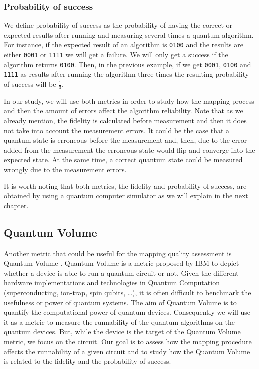 
\subsubsection{Probability of success}

We define probability of success as the probability of having the correct or expected results after running and measuring several times a quantum algorithm.
For instance, if the expected result of an algorithm is \texttt{0100} and the results are either \texttt{0001} or \texttt{1111} we will get a failure.
We will only get a success if the algorithm returns \texttt{0100}.
Then, in the previous example, if we get \texttt{0001}, \texttt{0100} and \texttt{1111} as results after running the algorithm three times the resulting probability of success will be \(\frac{1}{3}\).




In our study, we will use both metrics in order to study how the mapping process and then the amount of errors affect the  algorithm reliability.
Note that as we already mention, the fidelity is calculated before measurement and then it does  not take into account the measurement errors. It could be the case that a quantum state is erroneous before the measurement and, then, due to the error added from the measurement the erroneous state would flip and converge into the expected state.
At the same time, a correct quantum state could be measured wrongly due to the measurement errors.

It is worth noting that both metrics, the fidelity and probability of success, are obtained by using a quantum computer simulator as we will explain in the next chapter.

\subsection{Quantum Volume}
\label{sec:org3029336}

Another metric that could be useful for the mapping quality assessment is Quantum Volume \cite{Bishop_2017,Moll_2018}.
Quantum Volume is a metric proposed by IBM to depict whether a device is able to run a quantum circuit or not.
Given the different hardware implementations and technologies in Quantum Computation (superconducting, ion-trap, spin qubits, \ldots{}), it is often difficult to benchmark the usefulness or power of quantum systems. 
The aim of Quantum Volume is to quantify the computational power of quantum devices. 
Consequently we will use it as a metric to measure the runnability of the quantum algorithms on the quantum devices.
But, while the device is the target of the Quantum Volume metric, we focus on the circuit.
Our goal is to assess how the mapping procedure affects the runnability of a given circuit and to study how the Quantum Volume is related to the fidelity and the probability of success.

